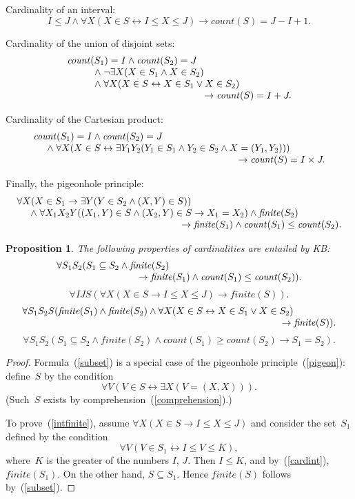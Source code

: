 \documentclass[11pt]{article}
\newtheorem{proposition}{Proposition}
\def\fnt{\mathit{finite}}
\def\lrar{\leftrightarrow}
\def\beq{\begin{equation}}
\def\eeq#1{\label{#1}\end{equation}}
\def\ba{\begin{array}}
\def\ea{\end{array}}
\newcommand{\co}{\ensuremath{\mathit{count}}}
\begin{document}
\begin{adjustwidth}{-1cm}{-1cm}
Cardinality of an interval:
\beq
I\leq J\land \forall X(X\in S \lrar I\leq X\leq J) \to \co(S) = J-I+1.
\eeq{cardint}

Cardinality of the union of disjoint sets:
\beq
\ba l
\co(S_1)=I \land \co(S_2)=J\\
\hskip 1cm
\land\; \neg\exists X(X\in S_1\land X\in S_2)\\
\hskip 1cm
\land\;\forall X(X\in S \lrar X\in S_1 \lor X\in S_2)\\
\hskip 5cm
\to \co(S)=I+J.
\ea\eeq{cardunion}

Cardinality of the Cartesian product:
\beq\ba l
\co(S_1)=I \land \co(S_2)=J\\
\hskip .5cm
\land\;\forall X(X\in S \lrar \exists Y_1Y_2(Y_1\in S_1 \land Y_2\in S_2
\land X=(Y_1,Y_2)))\\
\hskip 7.5cm
\to \co(S)=I\times J.
\ea\eeq{cardprod}

Finally, the pigeonhole principle:
\beq
\ba l
\forall X(X\in S_1 \to \exists Y (Y\in S_2 \land (X,Y)\in S))\\
\hskip .5cm
\land\;\forall X_1X_2Y((X_1,Y)\in S \land (X_2,Y)\in S \to X_1=X_2)
\land \fnt(S_2)\\
\hskip 6cm \to \fnt(S_1) \land \co(S_1)\leq \co(S_2).
\ea
\eeq{pigeon}

\begin{proposition}
The following properties of cardinalities are entailed by KB:
\beq
\ba l
\forall S_1S_2(S_1\subseteq S_2 \land \fnt(S_2)\\
\hskip 3cm
\to \fnt(S_1) \land \co(S_1)\leq \co(S_2)).
\ea
\eeq{subset}
\beq
\forall IJS(\forall X(X\in S \to I\leq X\leq J) \to \fnt(S)).
\eeq{intfinite}
\beq
\ba l
\forall S_1S_2S(\fnt(S_1) \land \fnt(S_2)
\land\forall X(X\in S \lrar X\in S_1 \lor X\in S_2)\\
\hskip 9.5cm
\to \fnt(S)).
\ea\eeq{unionfinite}
\beq
\forall S_1S_2(
S_1\subseteq S_2 \land \fnt(S_2) \land \co(S_1) \geq \co(S_2)\to S_1=S_2).
\eeq{propersubset}
\end{proposition}

\begin{proof}
Formula~(\ref{subset}) is a special case of the pigeonhole
principle~(\ref{pigeon}): define~$S$ by the condition
$$\forall V(V\in S \lrar \exists X(V=(X,X))).$$
(Such~$S$ exists by comprehension~(\ref{comprehension}).)

To prove~(\ref{intfinite}), assume $\forall X(X\in S \to I\leq X\leq J)$
and consider the set~$S_1$ defined by the condition
$$\forall V(V\in S_1\lrar I\leq V\leq K),$$
where~$K$ is the greater of the numbers $I$, $J$.  Then $I\leq K$, and
by~(\ref{cardint}), $\fnt(S_1)$.  On the other hand, $S\subseteq S_1$.
Hence $\fnt(S)$ follows by~(\ref{subset}).


\end{proof}
\end{adjustwidth}
\end{document}
